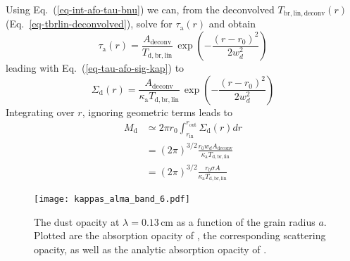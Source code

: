 \documentclass{aa}
\begin{document}
Using Eq.~(\ref{eq-int-afo-tau-bnu}) we can, from the deconvolved
$T_{\mathrm{br,lin,deconv}}(r)$ (Eq.~\ref{eq-tbrlin-deconvolved}), solve for
$\tau_{\mathrm{a}}(r)$ and obtain
\begin{equation}
  \tau_{\mathrm{a}}(r)=\frac{A_{\mathrm{deconv}}}{T_{\mathrm{d,br,lin}}}\,
  \exp\left(-\frac{(r-r_0)^2}{2w_d^2}\right)
\end{equation}
leading with Eq.~(\ref{eq-tau-afo-sig-kap}) to
\begin{equation}
  \Sigma_{\mathrm{d}}(r)=\frac{A_{\mathrm{deconv}}}{\kappa_{\mathrm{a}}T_{\mathrm{d,br,lin}}}\,
  \exp\left(-\frac{(r-r_0)^2}{2w_d^2}\right)
\end{equation}
Integrating over $r$, ignoring geometric terms leads to
\begin{equation}\label{eq-ringmass-from-obs}
  \begin{split}
    M_{\mathrm{d}} &\simeq 2\pi r_0\int_{r_{\mathrm{in}}}^{r_{\mathrm{out}}}\Sigma_{\mathrm{d}}(r)dr\\
    &= (2\pi)^{3/2}\frac{r_0w_dA_{\mathrm{deconv}}}{\kappa_{\mathrm{a}}T_{\mathrm{d,br,lin}}}\\
    &= (2\pi)^{3/2}\frac{r_0\sigma A}{\kappa_{\mathrm{a}}T_{\mathrm{d,br,lin}}}
  \end{split}
\end{equation}

\begin{figure}
\centerline{\texttt{[image: kappas\_alma\_band\_6.pdf]}}
\caption{\label{fig-opacities}The dust opacity at $\lambda=0.13\,\mathrm{cm}$
  as a function of the grain radius $a$. Plotted are the absorption opacity of
  \citet{2010A&A...512A..15R}, the corresponding scattering opacity, as well as
  the analytic absorption opacity of \citet{1997MNRAS.291..121I}.}
\end{figure}
\end{document}
